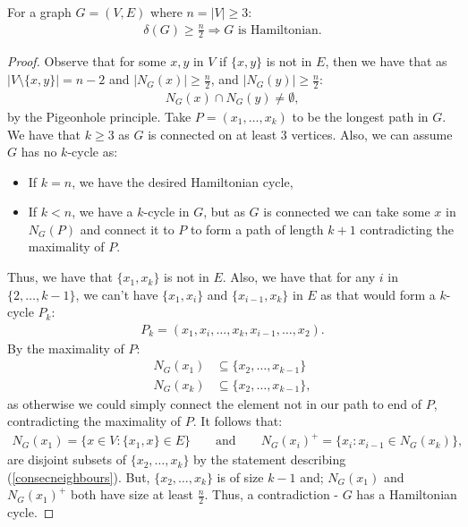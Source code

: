 For a graph $G = (V, E)$ where $n = |V| \geq 3$: \begin{gather*}
  \delta(G) \geq \frac{n}{2} \Rightarrow G \text{ is Hamiltonian.}
\end{gather*}
\begin{proof}
    Observe that for some $x, y$ in $V$ if $\{x, y\}$ is not in $E$,
    then we have that as $|V \setminus \{x, y\}| = n - 2$ and
    $|N_G(x)| \geq \frac{n}{2}$, and $|N_G(y)| \geq \frac{n}{2}$: 
    \begin{gather*}
        N_G(x) \cap N_G(y) \neq \emptyset,
    \end{gather*} by the Pigeonhole principle. Take $P = (x_1, \ldots, x_k)$
    to be the longest path in $G$. We have that $k \geq 3$ as $G$ is
    connected on at least 3 vertices. Also, we can assume $G$ has no
    $k$-cycle as: \begin{itemize}
        \item If $k = n$, we have the desired Hamiltonian cycle,
        \item If $k < n$, we have a $k$-cycle in $G$, but as $G$ is connected
        we can take some $x$ in $N_G(P)$ and connect it to $P$ to form
        a path of length $k + 1$ contradicting the maximality of $P$. 
    \end{itemize} Thus, we have that $\{x_1, x_k\}$ is not in $E$.
    Also, we have that for any $i$ in $\{2, \ldots, k - 1\}$, we can't
    have $\{x_1, x_i\}$ and $\{x_{i - 1}, x_k\}$ in $E$ as that would form
    a $k$-cycle $P_k$: \begin{gather} \label{consecneighbours}
        P_k = (x_1, x_i, \ldots, x_k, x_{i - 1}, \ldots, x_2).
    \end{gather} By the maximality of $P$: 
    \begin{equation*}   
        \begin{aligned}
            N_G(x_1) &\subseteq \{x_2, \ldots, x_{k - 1}\} \\
            N_G(x_k) &\subseteq \{x_2, \ldots, x_{k - 1}\},
        \end{aligned}
    \end{equation*}
    as otherwise we could simply connect the element not in our
    path to end of $P$, contradicting the maximality of $P$.
    It follows that: \begin{gather*}
        N_G(x_1) = \{x \in V : \{x_1, x\} \in E\} \qquad
        \text{and} \qquad
        N_G(x_i)^+ = \{x_i : x_{i - 1} \in N_G(x_k)\},
    \end{gather*} are disjoint subsets of $\{x_2, \ldots, x_k\}$
    by the statement describing (\ref{consecneighbours}).
    But, $\{x_2, \ldots, x_k\}$ is of size $k - 1$ and; 
    $N_G(x_1)$ and $N_G(x_1)^+$ both have size at least $\frac{n}{2}$.
    Thus, a contradiction - $G$ has a Hamiltonian cycle.
\end{proof}